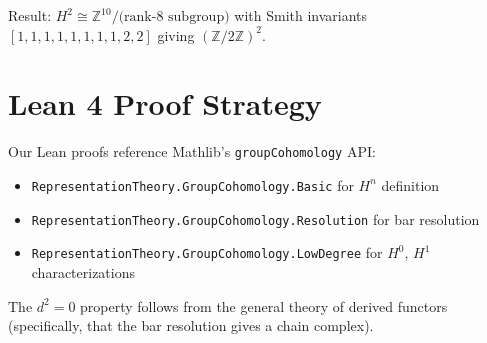 \documentclass[11pt,a4paper]{article}
\begin{document}
Result: $H^2 \cong \mathbb{Z}^{10}/\text{(rank-8 subgroup)}$ with
Smith invariants $[1,1,1,1,1,1,1,1,2,2]$ giving
$(\mathbb{Z}/2\mathbb{Z})^2$.

\section{Lean 4 Proof Strategy}\label{sec:lean}

Our Lean proofs reference Mathlib's \texttt{groupCohomology} API:
\begin{itemize}
  \item \texttt{RepresentationTheory.GroupCohomology.Basic} for $H^n$ definition
  \item \texttt{RepresentationTheory.GroupCohomology.Resolution} for bar resolution
  \item \texttt{RepresentationTheory.GroupCohomology.LowDegree} for $H^0$, $H^1$ characterizations
\end{itemize}

The $d^2 = 0$ property follows from the general theory of derived functors
(specifically, that the bar resolution gives a chain complex).
\end{document}
